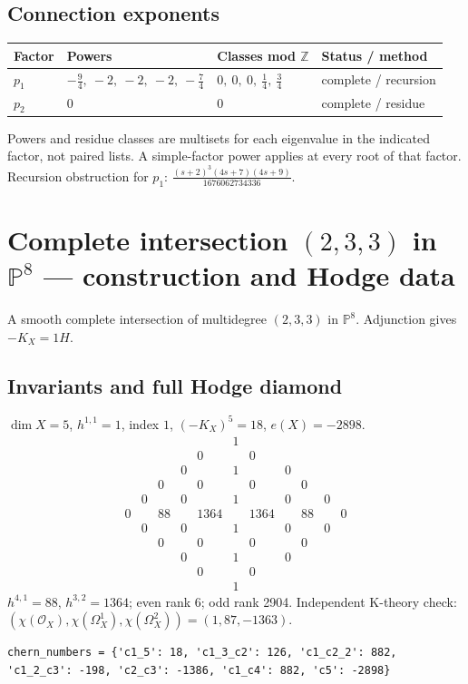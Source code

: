 \documentclass[10pt,a4paper]{article}
\begin{document}
\subsection*{Connection exponents}
\begin{center}\begin{tabular}{llll}\toprule Factor & Powers & Classes mod $\mathbb Z$ & Status / method\\\midrule
$p_{1}$ & $- \frac{9}{4},\ -2,\ -2,\ -2,\ - \frac{7}{4}$ & $0,\ 0,\ 0,\ \frac{1}{4},\ \frac{3}{4}$ & complete / recursion\\
$p_{2}$ & $0$ & $0$ & complete / residue\\
\bottomrule\end{tabular}\end{center}
Powers and residue classes are multisets for each eigenvalue in the indicated factor, not paired lists. A simple-factor power applies at every root of that factor.
Recursion obstruction for $p_{1}$: $\frac{\left(s + 2\right)^{3} \left(4 s + 7\right) \left(4 s + 9\right)}{1676062734336}$.
\clearpage\section*{Complete intersection $(2,3,3)$ in $\mathbb P^{8}$ --- construction and Hodge data}\label{entry:PCI5-2-3-3}
A smooth complete intersection of multidegree $(2,3,3)$ in $\mathbb P^{8}$.
Adjunction gives $-K_X=1H$.
\subsection*{Invariants and full Hodge diamond}
$\dim X=5$, $h^{1,1}=1$, index $1$, $(-K_X)^5=18$, $e(X)=-2898$.
\[\begin{array}{ccccccccccc}&&&&&1&&&&&\\&&&&0&&0&&&&\\&&&0&&1&&0&&&\\&&0&&0&&0&&0&&\\&0&&0&&1&&0&&0&\\0&&88&&1364&&1364&&88&&0\\&0&&0&&1&&0&&0&\\&&0&&0&&0&&0&&\\&&&0&&1&&0&&&\\&&&&0&&0&&&&\\&&&&&1&&&&&\end{array}\]
$h^{4,1}=88$, $h^{3,2}=1364$; even rank 6; odd rank 2904.
Independent K-theory check: $(\chi(\mathcal O_X),\chi(\Omega_X^1),\chi(\Omega_X^2))=(1, 87, -1363)$.
\begin{lstlisting}
chern_numbers = {'c1_5': 18, 'c1_3_c2': 126, 'c1_c2_2': 882, 'c1_2_c3': -198, 'c2_c3': -1386, 'c1_c4': 882, 'c5': -2898}
\end{lstlisting}
\end{document}
